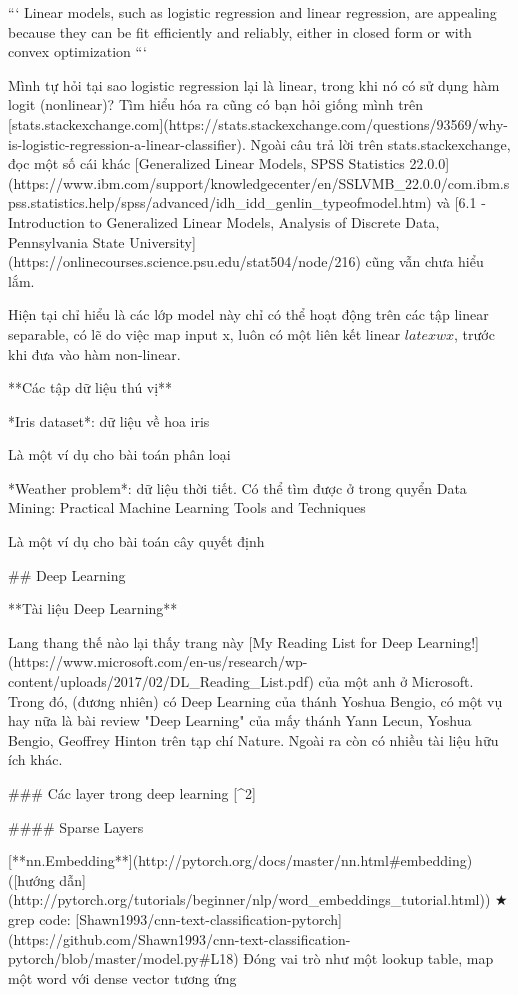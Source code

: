 ```
Linear models, such as logistic regression and linear
regression, are appealing because they can be ﬁt
eﬃciently and reliably, either in closed form or
with convex optimization
```

Mình tự hỏi tại sao logistic regression lại là linear, trong khi nó có sử dụng hàm logit (nonlinear)? Tìm hiểu hóa ra cũng có bạn hỏi giống mình trên [stats.stackexchange.com](https://stats.stackexchange.com/questions/93569/why-is-logistic-regression-a-linear-classifier). Ngoài câu trả lời trên stats.stackexchange, đọc một số cái khác [Generalized Linear Models, SPSS Statistics 22.0.0](https://www.ibm.com/support/knowledgecenter/en/SSLVMB_22.0.0/com.ibm.spss.statistics.help/spss/advanced/idh_idd_genlin_typeofmodel.htm)
và [6.1 - Introduction to Generalized Linear Models, Analysis of Discrete Data, Pennsylvania State University](https://onlinecourses.science.psu.edu/stat504/node/216) cũng vẫn chưa hiểu lắm.

Hiện tại chỉ hiểu là các lớp model này chỉ có thể hoạt động trên các tập linear separable, có lẽ do việc map input x, luôn có một liên kết linear $latex wx$, trước khi đưa vào hàm non-linear.

**Các tập dữ liệu thú vị**

*Iris dataset*: dữ liệu về hoa iris

Là một ví dụ cho bài toán phân loại

*Weather problem*: dữ liệu thời tiết. Có thể tìm được ở trong quyển Data Mining: Practical Machine Learning Tools and Techniques

Là một ví dụ cho bài toán cây quyết định

## Deep Learning

**Tài liệu Deep Learning**

Lang thang thế nào lại thấy trang này [My Reading List for Deep Learning!](https://www.microsoft.com/en-us/research/wp-content/uploads/2017/02/DL_Reading_List.pdf) của một anh ở Microsoft. Trong đó, (đương nhiên) có Deep Learning của thánh Yoshua Bengio, có một vụ hay nữa là bài review "Deep Learning" của mấy thánh Yann Lecun, Yoshua Bengio, Geoffrey Hinton trên tạp chí Nature. Ngoài ra còn có nhiều tài liệu hữu ích khác.

### Các layer trong deep learning [^2]

#### Sparse Layers

[**nn.Embedding**](http://pytorch.org/docs/master/nn.html#embedding) ([hướng dẫn](http://pytorch.org/tutorials/beginner/nlp/word_embeddings_tutorial.html))
★ grep code: [Shawn1993/cnn-text-classification-pytorch](https://github.com/Shawn1993/cnn-text-classification-pytorch/blob/master/model.py#L18)
Đóng vai trò như một lookup table, map một word với dense vector tương ứng

